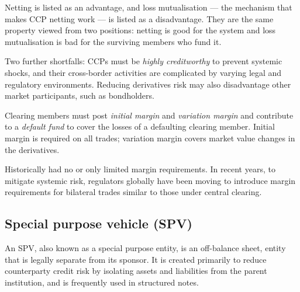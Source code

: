 \begin{crtrapbox}
Netting is listed as an advantage, and loss mutualisation --- the mechanism that
makes CCP netting work --- is listed as a disadvantage. They are the same
property viewed from two positions: netting is good for the system and loss
mutualisation is bad for the surviving members who fund it.
\end{crtrapbox}

Two further shortfalls: CCPs must be \emph{highly creditworthy} to prevent
systemic shocks, and their cross-border activities are complicated by varying
legal and regulatory environments. Reducing derivatives risk may also disadvantage
other market participants, such as bondholders.


\begin{crkeybox}
 Clearing members must post \emph{initial margin} and
\emph{variation margin} and contribute to a \emph{default fund} to cover the
losses of a defaulting clearing member. Initial margin is required on all trades;
variation margin covers market value changes in the derivatives.

\smallskip
{} Historically had no or only limited
margin requirements. In recent years, to mitigate systemic risk, regulators
globally have been moving to introduce margin requirements for bilateral trades
similar to those under central clearing.
\end{crkeybox}


\subsection*{Special purpose vehicle (SPV)}

An SPV, also known as a special purpose entity, is an off-balance sheet,
 entity that is legally separate from its sponsor. It is
created primarily to reduce counterparty credit risk by isolating assets and
liabilities from the parent institution, and is frequently used in structured
notes.

